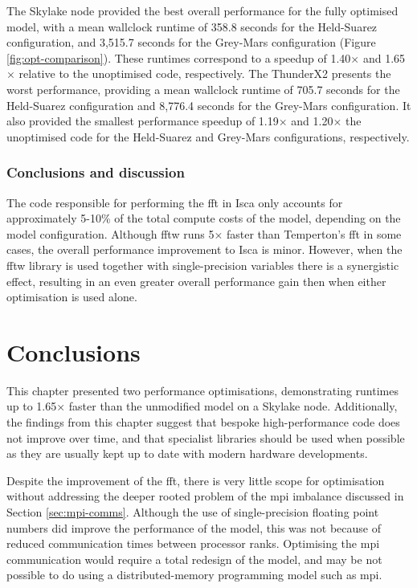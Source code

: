 \documentclass[a4paper,11pt]{report}
\begin{document}
The Skylake node provided the best overall performance for the fully optimised model, with a mean wallclock runtime of 358.8 seconds for the Held-Suarez configuration, and 3,515.7 seconds for the Grey-Mars configuration  (Figure \ref{fig:opt-comparison}). These runtimes correspond to a speedup of 1.40$\times$ and 1.65$\times$ relative to the unoptimised code, respectively.  The ThunderX2 presents the worst performance, providing a mean wallclock runtime of 705.7 seconds for the Held-Suarez configuration and 8,776.4 seconds for the Grey-Mars configuration. It also provided the smallest performance speedup of 1.19$\times$ and 1.20$\times$ the unoptimised code for the Held-Suarez and Grey-Mars configurations, respectively. 
\par

\subsubsection{Conclusions and discussion}
The code responsible for performing the \gls{fft} in Isca only accounts for approximately 5-10\% of the total compute costs of the model, depending on the model configuration. Although \gls{fftw} runs 5$\times$ faster than Temperton's \gls{fft} in some cases, the overall performance improvement to Isca is minor. However, when the \gls{fftw} library is used together with single-precision variables there is a synergistic effect, resulting in an even greater overall performance gain then when either optimisation is used alone. 
\par



\section{Conclusions}
This chapter presented two performance optimisations, demonstrating runtimes up to 1.65$\times$ faster than the unmodified model on a Skylake node. Additionally, the findings from this chapter suggest that bespoke high-performance code does not improve over time, and that specialist libraries should be used when possible as they are usually kept up to date with modern hardware developments.
\par
Despite the improvement of the \gls{fft}, there is very little scope for optimisation without addressing the deeper rooted problem of the \gls{mpi} imbalance discussed in Section \ref{sec:mpi-comms}. Although the use of single-precision floating point numbers did improve the performance of the model, this was not because of reduced communication times between processor ranks. Optimising the \gls{mpi} communication would require a total redesign of the model, and may be not possible to do using a distributed-memory programming model such as \gls{mpi}.
\end{document}
